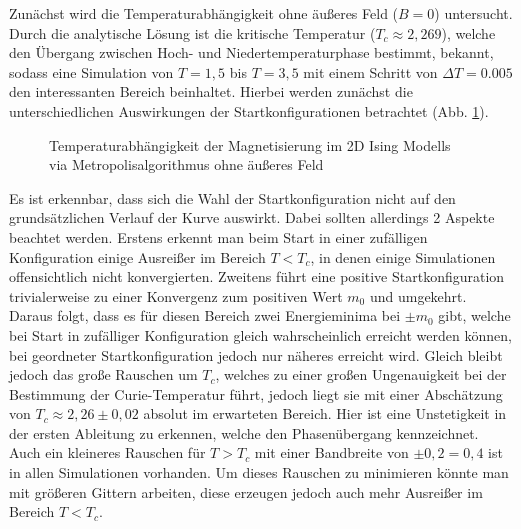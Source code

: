 Zunächst wird die Temperaturabhängigkeit ohne äußeres Feld ($B=0$) untersucht. Durch die analytische Lösung ist die kritische Temperatur ($T_{c}\approx 2,269$), welche den Übergang zwischen Hoch- und Niedertemperaturphase bestimmt, bekannt, sodass eine Simulation von $T=1,5$ bis $T=3,5$ mit einem Schritt von $\Delta T = 0.005$ den interessanten Bereich beinhaltet. Hierbei werden zunächst die unterschiedlichen Auswirkungen der Startkonfigurationen betrachtet (Abb. \ref{mp2d0modes}).
\begin{figure}[H]
	\centering
	\caption{Temperaturabhängigkeit der Magnetisierung im 2D Ising Modells via Metropolisalgorithmus ohne äußeres Feld}
	\label{mp2d0modes}
\end{figure}
Es ist erkennbar, dass sich die Wahl der Startkonfiguration nicht auf den grundsätzlichen Verlauf der Kurve auswirkt. Dabei sollten allerdings 2 Aspekte beachtet werden. Erstens erkennt man beim Start in einer zufälligen Konfiguration einige Ausreißer im Bereich $T<T_{c}$, in denen einige Simulationen offensichtlich nicht konvergierten. Zweitens führt eine positive Startkonfiguration trivialerweise zu einer Konvergenz zum positiven Wert $m_{0}$ und umgekehrt. Daraus folgt, dass es für diesen Bereich zwei Energieminima bei $\pm m_{0}$ gibt, welche bei Start in zufälliger Konfiguration gleich wahrscheinlich erreicht werden können, bei geordneter Startkonfiguration jedoch nur näheres erreicht wird. Gleich bleibt jedoch das große Rauschen um $T_{c}$, welches zu einer großen Ungenauigkeit bei der Bestimmung der Curie-Temperatur führt, jedoch liegt sie mit einer Abschätzung von $T_{c}\approx 2,26\pm 0,02$ absolut im erwarteten Bereich. Hier ist eine Unstetigkeit in der ersten Ableitung zu erkennen, welche den Phasenübergang kennzeichnet. Auch ein kleineres Rauschen für $T>T_{c}$ mit einer Bandbreite von $\pm 0,2 = 0,4$ ist in allen Simulationen vorhanden. Um dieses Rauschen zu minimieren könnte man mit größeren Gittern arbeiten, diese erzeugen jedoch auch mehr Ausreißer im Bereich $T<T_{c}$.


